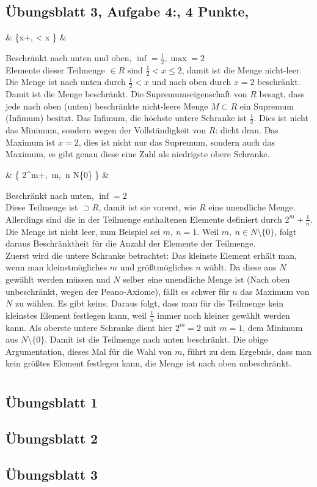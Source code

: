 \documentclass[12pt,a4paper]{report}
\begin{document}
	\section{Übungsblatt 3, Aufgabe 4:, 4 Punkte, \GruppeA}
		\begin{flalign*}
			&  \left\{x+,  < x  \right\} &
		\end{flalign*}
			Beschränkt nach unten und oben, $\inf = \frac{1}{2},\max = 2$\\
			Elemente dieser Teilmenge $\in R$ sind $ \frac{1}{2} < x \leq 2$, damit ist die Menge nicht-leer. Die Menge ist nach unten durch $ \frac{1}{2} < x $ und nach oben durch $ x = 2 $ beschränkt. Damit ist die Menge beschränkt. Die Supremumseigenschaft von $R$ besagt, dass jede nach oben (unten) beschränkte nicht-leere Menge $M \subset R$ ein Supremum (Infimum) besitzt. Das Infimum, die höchste untere Schranke ist $\frac{1}{2}$. Dies ist nicht das Minimum, sondern  wegen der Vollständigkeit von $R$: dicht dran. Das Maximum ist $x=2$, dies ist nicht nur das Supremum, sondern auch das Maximum, es gibt genau diese eine Zahl als niedrigste obere Schranke.\\
		\begin{flalign*}
			&  \left\{ 2^m+,~m,~n \in N\setminus\{0\} \right\} & 
		\end{flalign*}
			Beschränkt nach unten, $\inf = 2$\\ 
			Diese Teilmenge ist $\supset R$, damit ist sie vorerst, wie $R$ eine unendliche Menge. Allerdings sind die in der Teilmenge enthaltenen Elemente definiert durch $2^m+\frac{1}{n}$. Die Menge ist nicht leer, zum Beispiel sei $m,~n=1$. Weil $m,~n \in N \setminus \{0\}$, folgt daraus Beschränktheit für die Anzahl der Elemente der Teilmenge. \\
			Zuerst wird die untere Schranke betrachtet: Das kleinste Element erhält man, wenn man kleinstmögliches $m$ und größtmögliches $n$ wählt. Da diese aus $N$ gewählt werden müssen und $N$ selber eine unendliche Menge ist (Nach oben unbeschränkt, wegen der Peano-Axiome), fällt es schwer für $n$ das Maximum von $N$ zu wählen. Es gibt keins. Daraus folgt, dass man für die Teilmenge kein kleinstes Element festlegen kann, weil $\frac{1}{n}$ immer noch kleiner gewählt werden kann. Als oberste untere Schranke dient hier $2^m = 2$ mit $m=1$, dem Minimum aus $N \setminus \{0\}$. Damit ist die Teilmenge nach unten beschränkt. Die obige Argumentation, dieses Mal für die Wahl von $m$, führt zu dem Ergebnis, dass man kein größtes Element festlegen kann, die Menge ist nach oben unbeschränkt.
\appendices
	\chapter{}
	\section{Übungsblatt 1}\label{uebungsblatt1}
	
	\section{Übungsblatt 2}\label{uebungsblatt2}
	
	\section{Übungsblatt 3}\label{uebungsblatt3}
	
\end{document}
